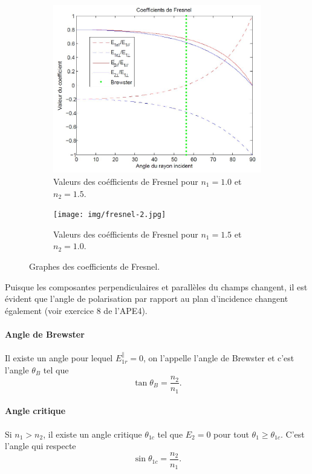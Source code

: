 \begin{figure}[ht]
	\centering
	\begin{subfigure}[b]{0.45\textwidth}
		\centering
		\includegraphics[scale=0.40]{img/fresnel-1.jpg}
		\caption{Valeurs des coéfficients de Fresnel pour $n_1 = 1.0$ et $n_2 = 1.5$.}
		\label{fig:fresnel-1}
	\end{subfigure}
	\begin{subfigure}[b]{0.45\textwidth}
		\centering
		\texttt{[image: img/fresnel-2.jpg]}
		\caption{Valeurs des coéfficients de Fresnel pour $n_1 = 1.5$ et $n_2 = 1.0$.}
		\label{fig:fresnel-2}
	\end{subfigure}
	\caption{Graphes des coefficients de Fresnel.}
\end{figure}

\begin{myrem}
	Puisque les composantes perpendiculaires et parallèles
	du champs changent, il est évident que l'angle de polarisation
	par rapport au plan d'incidence changent également (voir
	exercice 8 de l'APE4).
\end{myrem}

\paragraph{Angle de Brewster}
Il existe un angle pour lequel $E_{1r}^\parallel = 0$,
on l'appelle l'angle de Brewster et c'est l'angle $\theta_B$ tel que
\[ \tan\theta_B = \frac{n_2}{n_1}. \]

\paragraph{Angle critique}
Si $n_1 > n_2$, il existe un angle critique $\theta_{1c}$ tel que
$E_{2} = 0$ pour tout $\theta_1 \geq \theta_{1c}$.
C'est l'angle qui respecte
\[ \sin\theta_{1c} = \frac{n_2}{n_1}. \]

